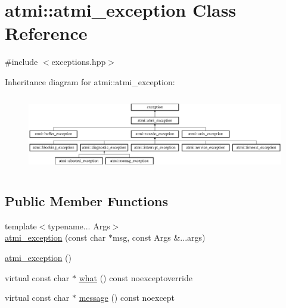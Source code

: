 \hypertarget{classatmi_1_1atmi__exception}{\section{atmi\+:\+:atmi\+\_\+exception Class Reference}
\label{classatmi_1_1atmi__exception}
}


{\ttfamily \#include $<$exceptions.\+hpp$>$}

Inheritance diagram for atmi\+:\+:atmi\+\_\+exception\+:\begin{figure}[H]
\begin{center}
\leavevmode
\includegraphics[height=3.373494cm]{classatmi_1_1atmi__exception}
\end{center}
\end{figure}
\subsection*{Public Member Functions}
\begin{DoxyCompactItemize}
\item 
{\footnotesize template$<$typename... Args$>$ }\\\hyperlink{classatmi_1_1atmi__exception_a95882b5a28a14774110080a50601abd5}{atmi\+\_\+exception} (const char $\ast$msg, const Args \&...args)
\item 
\hyperlink{classatmi_1_1atmi__exception_afa30faf28ecbc27a8aeb06dccd3b1de6}{atmi\+\_\+exception} ()
\item 
virtual const char $\ast$ \hyperlink{classatmi_1_1atmi__exception_a7e527bcd2919ba17b332ea827ec28a22}{what} () const noexceptoverride
\item 
virtual const char $\ast$ \hyperlink{classatmi_1_1atmi__exception_a0fddf8efafd5e23acbe913beeccd33fc}{message} () const noexcept
\end{DoxyCompactItemize}
